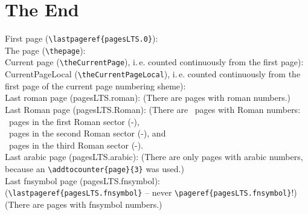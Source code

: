 \documentclass[british]{article}
\def\pagesLTSexampleArabic{3}
\begin{document}
\newpage

\section{The End}

\noindent First page (\texttt{\textbackslash lastpageref\{pagesLTS.0\}}):
 \\

\noindent The page (\texttt{\textbackslash thepage}): \thepage \\

\noindent Current page (\texttt{\textbackslash theCurrentPage}),
i.\,e. counted continuously from the first page): \theCurrentPage \\

\noindent CurrentPageLocal (\texttt{\textbackslash theCurrentPageLocal}),
i.\,e. counted continuously from the first page of the
current page numbering sheme): \theCurrentPageLocal \\

\noindent Last roman page (pagesLTS.roman): 
(There are  pages with roman numbers.)\\

\noindent Last Roman page (pagesLTS.Roman): 
(There are ~pages with Roman numbers:\\
~pages in the first Roman sector
(\pageref{Roman}{\hskip3em }-),\\
~pages in the second Roman sector
(\pageref{Roman2}{\hskip3em }-), and\\
~pages in the third Roman sector
(\pageref{Roman3}{\hskip3em }-).\\

\noindent Last arabic page (pagesLTS.arabic): 
(There are only  pages with arabic numbers,
because an \texttt{\textbackslash addtocounter\{page\}\{\pagesLTSexampleArabic\}} was used.)\\

\noindent Last fnsymbol page (pagesLTS.fnsymbol):  \\
(\texttt{\textbackslash lastpageref\{pagesLTS.fnsymbol\}} -- never
\texttt{\textbackslash pageref\{pagesLTS.fnsymbol\}}!)\\
(There are  pages with fnsymbol numbers.)\\
\end{document}
